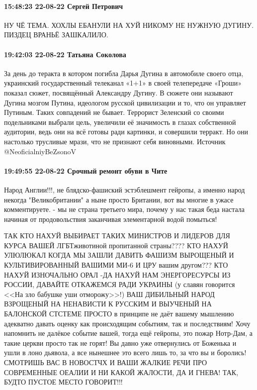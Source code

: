  
 
 
 
 

\paragraph{15:48:23 22-08-22 Сергей Петрович}
НУ ЧЁ ТЕМА.
ХОХЛЫ ЕБАНУЛИ НА ХУЙ НИКОМУ НЕ НУЖНУЮ ДУГИНУ.
ПИЗДЕЦ ВРАНЬЁ ЗАШКАЛИЛО.

\paragraph{19:42:03 22-08-22 Татьяна Соколова}

За день до теракта в котором погибла Дарья Дугина в автомобиле своего отца, украинский государственный телеканал «1+1» в своей телепередаче «Гроши» показал сюжет, посвящённый Александру Дугину. В сюжете они называют Дугина мозгом Путина, идеологом русской цивилизации и то, что он управляет Путиным.
Таких совпадений не бывает. Террорист Зеленский со своими подельниками выбрали цель, увеличили её значимость в глазах собственной аудитории, ведь они на всё готовы ради картинки, и совершили терракт. Но они настолько трусливые мрази, что не признают себя виновными.
Источник
@NeoficialniyBeZsonoV


\paragraph{19:49:55 22-08-22 Срочный ремонт обуви в Чите}

Народ Англии!!!, не блядско-фашиский эстэблешмент гейропы, а именно народ некогда "Великобритании" а ныне просто Британии, вот вы многие в ужасе комментируете. - мы не страна третьего мира, почему у нас такая беда настала начиная от продовольствия заканчивая элементарной водой помыться!

ТАК КТО НАХУЙ ВЫБИРАЕТ ТАКИХ МИНИСТРОВ И ЛИДЕРОВ ДЛЯ КУРСА ВАШЕЙ ЛГБТживотиной пропитанной страны???? КТО НАХУЙ УЛЮЛЮКАЛ КОГДА МЫ ЗАШЛИ ДАВИТЬ ФАШИЗМ ВЫРОЩЕНЫЙ И КУЛЬТИВИРОВАННЫЙ ВАШИМИ МИ-6 И ЦРУ вашим другом??? КТО НАХУЙ ИЗНОЧАЛЬНО ОРАЛ -ДА НАХУЙ НАМ ЭНЕРГОРЕСУРСЫ ИЗ РОССИИ, ДАВАЙТЕ ОТКАЖЕМСЯ РАДИ УКРАИНЫ (у славян говорится <<На зло бабушке уши отморожу>>!) ВАШ ДИБИЛЬНЫЙ НАРОД ВЗРОЩЕНЫЙ НА НЕНАВИСТИ К РУССКИМ И ВЫУЧЕНЫЙ НА БАЛОНСКОЙ СТСТЕМЕ ПРОСТО в принципе не даёт вашему мышлению адекватно давать оценку как происходящим событиям, так и последствиям! Хочу напомнить не далёкое событие вашей, тогда ещё гейропы, это пожар Нотр-Дам, а такие церкви просто так не горят! Вы давно уже отвернулись от Боженька и ушли в лоно дьявола, а все нынешнее это всего лишь то, за что вы и боролись! СМОТРИШЬ ВАС В НОВОСТЧХ И ВАШИ ЖАЛКИЕ РЕЧИ ПРО СОВРЕМЕННЫЕ ОЕАЛИИ И НИ КАКОЙ ЖАЛОСТИ, ДА И ГНЕВА! ТАК, БУДТО ПУСТОЕ МЕСТО ГОВОРИТ!!!

